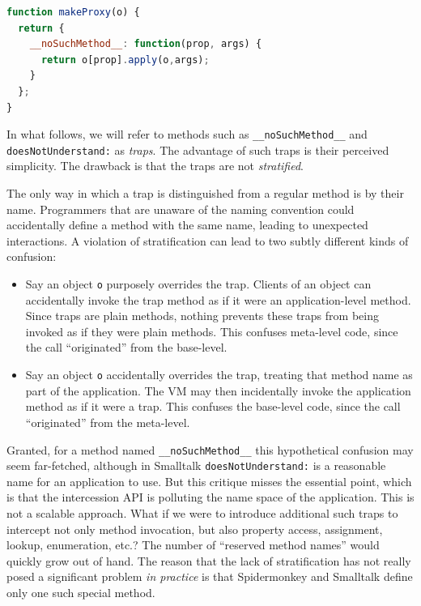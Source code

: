 \documentclass{acm_proc_article-sp}
\newcommand{\noSuchMethod}{\texttt{\_\_noSuchMethod\_\_}}
\begin{document}
\begin{lstlisting}[language=javascript]
function makeProxy(o) {
  return {
    __noSuchMethod__: function(prop, args) {
      return o[prop].apply(o,args);
    }
  };
}
\end{lstlisting}

In what follows, we will refer to methods such as \noSuchMethod{} and \texttt{doesNotUnderstand:} as \emph{traps}. The advantage of such traps is their perceived simplicity. The drawback is that the traps are not \emph{stratified}.

The only way in which a trap is distinguished from a regular method is by their name. Programmers that are unaware of the naming convention could accidentally define a method with the same name, leading to unexpected interactions. A violation of stratification can lead to two subtly different kinds of confusion:

\begin{itemize}
  \item Say an object \texttt{o} purposely overrides the trap. Clients of an object can accidentally invoke the trap method as if it were an application-level method. Since traps are plain methods, nothing prevents these traps from being invoked as if they were plain methods. This confuses meta-level code, since the call ``originated'' from the base-level.
  \item Say an object \texttt{o} accidentally overrides the trap, treating that method name as part of the application. The VM may then incidentally invoke the application method as if it were a trap. This confuses the base-level code, since the call ``originated'' from the meta-level.
\end{itemize}

Granted, for a method named \noSuchMethod{} this hypothetical confusion may seem far-fetched, although in Smalltalk \texttt{doesNotUnderstand:} is a reasonable name for an application to use. But this critique misses the essential point, which is that the intercession API is polluting the name space of the application. This is not a scalable approach. What if we were to introduce additional such traps to intercept not only method invocation, but also property access, assignment, lookup, enumeration, etc.? The number of ``reserved method names'' would quickly grow out of hand. The reason that the lack of stratification has not really posed a significant problem \emph{in practice} is that Spidermonkey and Smalltalk define only one such special method.
\end{document}
